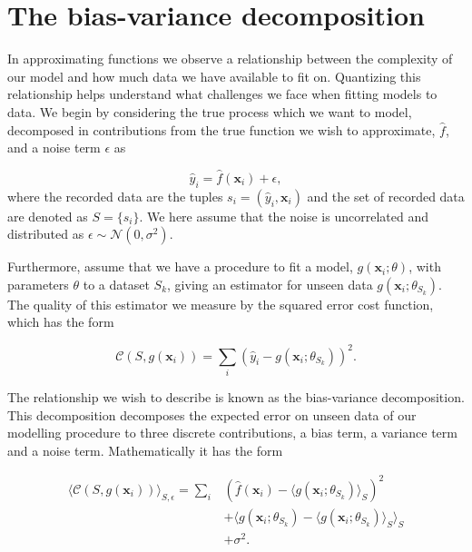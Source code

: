 \chapter{The bias-variance decomposition}\label{appendix:bias_variance}

In approximating functions we observe a relationship between the complexity of our model and how much data we have available to fit on. Quantizing this relationship helps understand what challenges we face when fitting models to data. We begin by considering the true process which we want to model, decomposed in contributions from the true function we wish to approximate, $\hat{f}$, and a noise term $\epsilon$ as

\begin{equation}
\hat{y}_i = \hat{f}(\boldsymbol{x}_i) + \epsilon,
\end{equation}
\noindent where the recorded data are the tuples $s_i = (\hat{y}_i, \boldsymbol{x}_i)$ and the set of recorded data are denoted as $S = \{s_i\}$. We here assume that the noise is uncorrelated and distributed as $\epsilon \sim \mathcal{N}(0, \sigma^2)$.

Furthermore, assume that we have a procedure to fit a model, $g(\boldsymbol{x}_i; \theta)$, with parameters $\theta$ to a dataset $S_k$, giving an estimator for unseen data $g(\boldsymbol{x}_i; \theta _{S_k})$. The quality of this estimator we measure by the squared error cost function, which has the form

\begin{equation}
\mathcal{C}(S, g(\boldsymbol{x}_i)) = \sum_i (\hat{y}_i - g(\boldsymbol{x}_i; \theta_{S_k}))^2.
\end{equation}

\noindent The relationship we wish to describe is known as the bias-variance decomposition. This decomposition decomposes the expected error on unseen data of our modelling procedure to three discrete contributions, a bias term, a variance term and a noise term. Mathematically it has the form

\begin{equation}
\begin{split}
\langle \mathcal{C}(S, g(\boldsymbol{x}_i)) \rangle_{S, \epsilon} = \sum_i &(\hat{f}(\boldsymbol{x}_i) - \langle g(\boldsymbol{x}_i ; \theta_{S_k} )\rangle_S)^2 \\
& + \langle g(\boldsymbol{x}_i ; \theta_{S_k}) - \langle g(\boldsymbol{x}_i ; \theta_{S_k}) \rangle_S \rangle_S  \\
& + \sigma^2.
\end{split}
\end{equation}

